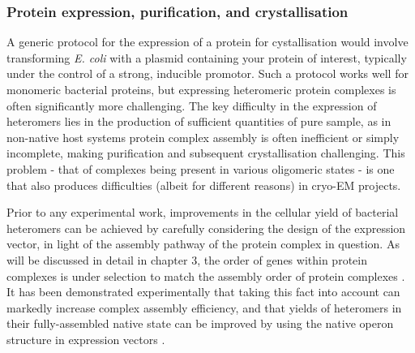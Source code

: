 \documentclass[a4paper,11pt,twoside,openright]{scrbook}
\begin{document}
\subsubsection{Protein expression, purification, and crystallisation}
A generic protocol for the expression of a protein for cystallisation would involve transforming \textit{E. coli} with a plasmid containing your protein of interest, typically under the control of a strong, inducible promotor. Such a protocol works well for monomeric bacterial proteins, but expressing heteromeric protein complexes is often significantly more challenging. The key difficulty in the expression of heteromers lies in the production of sufficient quantities of pure sample, as in non-native host systems protein complex assembly is often inefficient or simply incomplete, making purification and subsequent crystallisation challenging. This problem - that of complexes being present in various oligomeric states - is one that also produces difficulties (albeit for different reasons) in cryo-EM projects.

Prior to any experimental work, improvements in the cellular yield of bacterial heteromers can be achieved by carefully considering the design of the expression vector, in light of the assembly pathway of the protein complex in question. As will be discussed in detail in chapter 3, the order of genes within protein complexes is under selection to match the assembly order of protein complexes \cite{Wells2016}. It has been demonstrated experimentally that taking this fact into account can markedly increase complex assembly efficiency, and that yields of heteromers in their fully-assembled native state can be improved by using the native operon structure in expression vectors \cite{Shieh2015a, Poulsen2010}.
\end{document}
